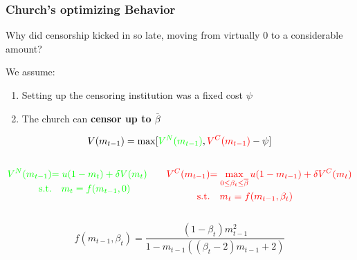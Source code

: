 \documentclass[aspectratio=169,red,12pt]{beamer}
\begin{document}
\begin{frame}
	\frametitle{Church's optimizing Behavior}
	Why did censorship kicked in so late, moving from virtually 0 to a considerable amount?\\ \vspace{0.15cm}

	We assume: 
	\begin{enumerate}
	\item Setting up the censoring institution was a fixed cost $\psi$
    \item The church can \textbf{censor up to $\bar{\beta}$}\vspace{0.3cm}
	\end{enumerate}
   $$	
    V(m_{t-1})=\max[{\color{green}V^N(m_{t-1})},{\color{red}V^C(m_{t-1})}-\psi]
  $$ 
  \vspace{-1.3cm}
    \begin{columns}	
    	\begin{column}[t]{0.44\textwidth}
    	 \begin{align*}
    	{\color{green}V^{N}(m_{t-1})}&{\color{green}=u(1-m_{t})+\delta V(m_{t})}	\\
    	{\color{green}\text{s.t.}}&{\color{green}\quad m_{t}=f(m_{t-1},0)}
    	\end{align*}
    	\end{column}   	
    	\begin{column}[t]{0.52\textwidth}
    	 \begin{align*}
    {\color{red}V^{C}(m_{t-1})}&{\color{red}=\max_{0\leq\beta_t\leq\overline{\beta}}u(1-m_{t-1})+\delta V^C(m_{t})}	\\
    	{\color{red}\text{s.t.}}&{\color{red}\quad m_{t}=f(m_{t-1},\beta_t)}
    	\end{align*}
    	\end{column} 	
    \end{columns}

$$  f(m_{t-1},\beta_t)=\frac{(1-\beta_t) m_{t-1}^2}{1-m_{t-1} ((\beta_t -2) m_{t-1}+2)}$$
\end{frame}
\end{document}
